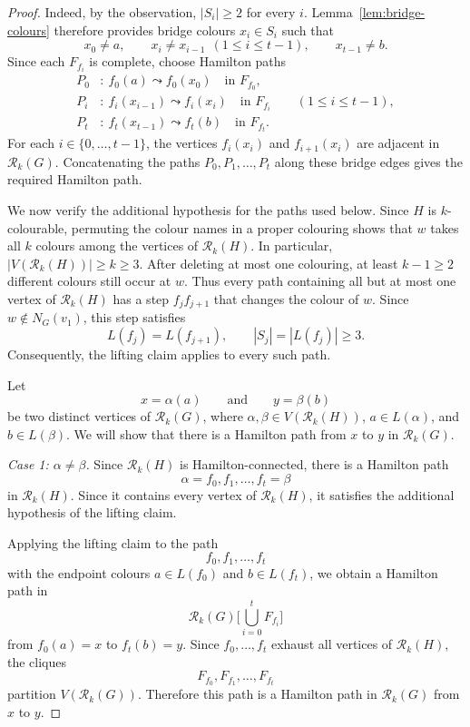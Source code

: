 \documentclass[11pt]{article}
\theoremstyle{remark}
\newcommand{\Rk}{\mathcal R_k}
\numberwithin{equation}{section}
\numberwithin{table}{section}
\begin{document}
\begin{proof}
Indeed, by the observation, $|S_i|\ge2$ for every $i$.
Lemma~\ref{lem:bridge-colours} therefore provides bridge colours
$x_i\in S_i$ such that
\[
x_0\neq a,\qquad x_i\neq x_{i-1}\ \ (1\leq i\leq t-1),\qquad x_{t-1}\neq b.
\]
Since each $F_{f_i}$ is complete, choose Hamilton paths
\begin{align*}
P_0&:\ f_0(a)\leadsto f_0(x_0)\quad \text{in }F_{f_0},\\
P_i&:\ f_i(x_{i-1})\leadsto f_i(x_i)\quad \text{in }F_{f_i}\qquad (1\leq i\leq t-1),\\
P_t&:\ f_t(x_{t-1})\leadsto f_t(b)\quad \text{in }F_{f_t}.
\end{align*}
For each $i\in\{0,\dots,t-1\}$, the vertices $f_i(x_i)$ and $f_{i+1}(x_i)$ are adjacent in $\Rk(G)$. Concatenating the paths $P_0,P_1,\dots,P_t$ along these bridge edges gives the required Hamilton path.

We now verify the additional hypothesis for the paths used below.
Since $H$ is $k$-colourable, permuting the colour names in a proper
colouring shows that $w$ takes all $k$ colours among the vertices of
$\Rk(H)$. In particular, $|V(\Rk(H))|\ge k\ge3$.
After deleting at most one colouring, at least $k-1\ge2$ different
colours still occur at $w$. Thus every path containing all but at most
one vertex of $\Rk(H)$ has a step $f_jf_{j+1}$ that changes
the colour of $w$. Since $w\notin N_G(v_1)$, this step satisfies
\[
L(f_j)=L(f_{j+1}),\qquad
|S_j|=|L(f_j)|\ge3.
\]
Consequently, the lifting claim applies to every such path.

Let
\[
x=\alpha(a)\qquad \text{and} \qquad y=\beta(b)
\]
be two distinct vertices of $\Rk(G)$, where $\alpha,\beta\in V(\Rk(H))$, $a\in L(\alpha)$, and $b\in L(\beta)$. 
We will show that there is a Hamilton path from $x$ to $y$ in $\Rk(G)$.

\smallskip

\noindent\textit{Case 1: $\alpha\neq \beta$.}
Since $\Rk(H)$ is Hamilton-connected, there is a Hamilton path
\[
\alpha=f_0,f_1,\dots,f_t=\beta
\]
in $\Rk(H)$. Since it contains every vertex of
$\Rk(H)$, it satisfies the additional hypothesis of the
lifting claim.

Applying the lifting claim to the path
\[
f_0,f_1,\dots,f_t
\]
with the endpoint colours $a\in L(f_0)$ and $b\in L(f_t)$, we obtain a Hamilton path in
\[
\Rk(G)\bigg[\bigcup_{i=0}^{t}F_{f_i}\bigg]
\]
from $f_0(a)=x$ to $f_t(b)=y$. Since $f_0,\dots,f_t$ exhaust all vertices of $\Rk(H)$, the cliques
\[
F_{f_0},F_{f_1},\dots,F_{f_t}
\]
partition $V(\Rk(G))$. Therefore this path is a Hamilton path in $\Rk(G)$ from $x$ to $y$.


\end{proof}
\end{document}
